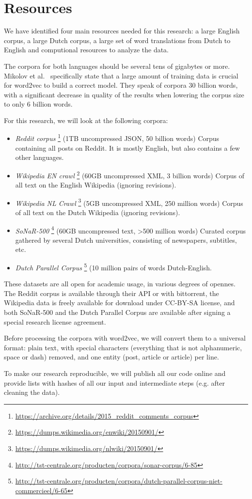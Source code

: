 \section{Resources}
\label{sec:resources}
We have identified four main resources needed for this research: a large English corpus, a large Dutch corpus, a large set of word translations from Dutch to English and computional resources to analyze the data.

The corpora for both languages should be several tens of gigabytes or more. Mikolov et al.~\cite{mikolov2013distributed} specifically state that a large amount of training data is crucial for word2vec to build a correct model. They speak of corpora 30 billion words, with a significant decrease in quality of the results when lowering the corpus size to only 6 billion words.

For this research, we will look at the following corpora:
\begin{itemize}
  \item \textit{Reddit corpus}
    \footnote{\url{https://archive.org/details/2015_reddit_comments_corpus}}
    (1TB uncompressed JSON, 50 billion words) Corpus containing all posts on Reddit. It is mostly English, but also contains a few other languages.
  \item \textit{Wikipedia EN crawl} 
    \footnote{\url{https://dumps.wikimedia.org/enwiki/20150901/}}
    (60GB uncompressed XML, 3 billion words) Corpus of all text on the English Wikipedia (ignoring revisions).
  \item \textit{Wikipedia NL Crawl} 
    \footnote{\url{https://dumps.wikimedia.org/nlwiki/20150901/}}
    (5GB uncompressed XML, 250 million words) Corpus of all text on the Dutch Wikipedia (ignoring revisions).
  \item \textit{SoNaR-500} 
    \footnote{\url{http://tst-centrale.org/producten/corpora/sonar-corpus/6-85}}
    (60GB uncompressed text, >500 million words) Curated corpus gathered by several Dutch universities, consisting of newspapers, subtitles, etc.
  \item \textit{Dutch Parallel Corpus} 
    \footnote{\url{http://tst-centrale.org/producten/corpora/dutch-parallel-corpus-niet-commercieel/6-65}}
    (10 million pairs of words Dutch-English.
\end{itemize}

These datasets are all open for academic usage, in various degrees of opennes. The Reddit corpus is available through their API or with bittorrent, the Wikipedia data is freely available for download under CC-BY-SA license, and both SoNaR-500 and the Dutch Parallel Corpus are available after signing a special research license agreement.

Before processing the corpora with word2vec, we will convert them to a universal format: plain text, with special characters (everything that is not alphanumeric, space or dash) removed, and one entity (post, article or article) per line.

To make our research reproducible, we will publish all our code online and provide lists with hashes of all our input and intermediate steps (e.g. after cleaning the data).